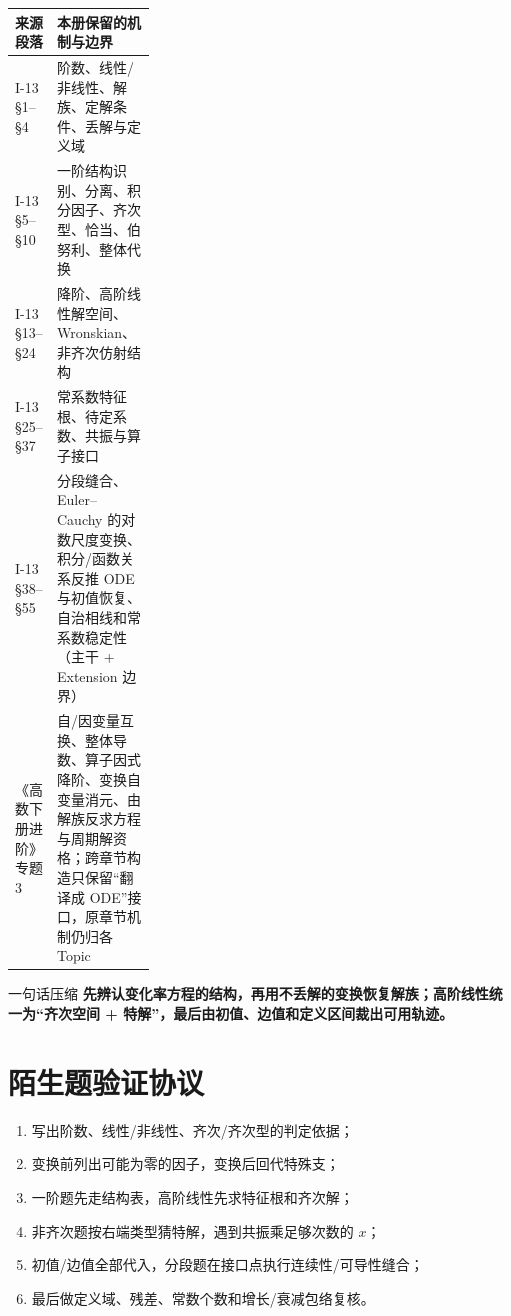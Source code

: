 \documentclass[11pt,a4paper,fontset=fandol]{ctexart}
\begin{document}
\begin{tabularx}{\linewidth}{L{0.28\linewidth}Y}
\toprule
来源段落 & 本册保留的机制与边界 \\
\midrule
I-13 §1--§4 & 阶数、线性/非线性、解族、定解条件、丢解与定义域 \\
I-13 §5--§10 & 一阶结构识别、分离、积分因子、齐次型、恰当、伯努利、整体代换 \\
I-13 §13--§24 & 降阶、高阶线性解空间、Wronskian、非齐次仿射结构 \\
I-13 §25--§37 & 常系数特征根、待定系数、共振与算子接口 \\
I-13 §38--§55 & 分段缝合、Euler--Cauchy 的对数尺度变换、积分/函数关系反推 ODE 与初值恢复、自治相线和常系数稳定性（主干 + Extension 边界） \\
《高数下册进阶》专题3 & 自/因变量互换、整体导数、算子因式降阶、变换自变量消元、由解族反求方程与周期解资格；跨章节构造只保留“翻译成 ODE”接口，原章节机制仍归各 Topic \\
\bottomrule
\end{tabularx}

\begin{corebox}{一句话压缩}
\textbf{先辨认变化率方程的结构，再用不丢解的变换恢复解族；高阶线性统一为“齐次空间 + 特解”，最后由初值、边值和定义区间裁出可用轨迹。}
\end{corebox}

\section{陌生题验证协议}
\begin{enumerate}
  \item 写出阶数、线性/非线性、齐次/齐次型的判定依据；
  \item 变换前列出可能为零的因子，变换后回代特殊支；
  \item 一阶题先走结构表，高阶线性先求特征根和齐次解；
  \item 非齐次题按右端类型猜特解，遇到共振乘足够次数的 $x$；
  \item 初值/边值全部代入，分段题在接口点执行连续性/可导性缝合；
  \item 最后做定义域、残差、常数个数和增长/衰减包络复核。
\end{enumerate}
\end{document}
